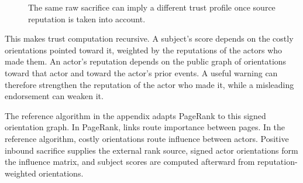 \documentclass[11pt]{article}
\begin{document}
\begin{figure}[htbp]
\centering
{}
\caption{The same raw sacrifice can imply a different trust profile once source reputation is taken into account.}
\end{figure}

This makes trust computation recursive. A subject's score depends on the costly orientations pointed toward it, weighted by the reputations of the actors who made them. An actor's reputation depends on the public graph of orientations toward that actor and toward the actor's prior events. A useful warning can therefore strengthen the reputation of the actor who made it, while a misleading endorsement can weaken it.

The reference algorithm in the appendix adapts PageRank \cite{page1999pagerank} to this signed orientation graph. In PageRank, links route importance between pages. In the reference algorithm, costly orientations route influence between actors. Positive inbound sacrifice supplies the external rank source, signed actor orientations form the influence matrix, and subject scores are computed afterward from reputation-weighted orientations.
\end{document}
